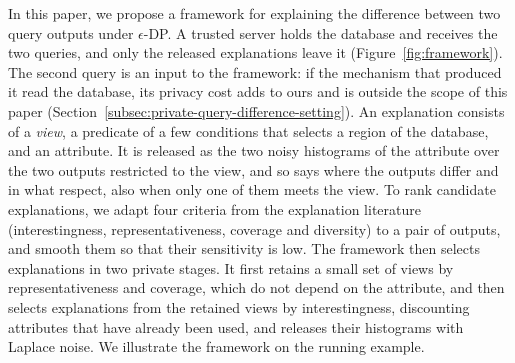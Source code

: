 In this paper, we propose a framework for explaining the difference between two query outputs under $\epsilon$-DP.
A trusted server holds the database and receives the two queries, and only the released explanations leave it (Figure~\ref{fig:framework}).
The second query is an input to the framework: if the mechanism that produced it read the database, its privacy cost adds to ours and is outside the scope of this paper (Section~\ref{subsec:private-query-difference-setting}).
An explanation consists of a \emph{view}, a predicate of a few conditions that selects a region of the database, and an attribute.
It is released as the two noisy histograms of the attribute over the two outputs restricted to the view, and so says where the outputs differ and in what respect, also when only one of them meets the view.
To rank candidate explanations, we adapt four criteria from the explanation literature (interestingness, representativeness, coverage and diversity) to a pair of outputs, and smooth them so that their sensitivity is low.
The framework then selects explanations in two private stages.
It first retains a small set of views by representativeness and coverage, which do not depend on the attribute, and then selects explanations from the retained views by interestingness, discounting attributes that have already been used, and releases their histograms with Laplace noise.
We illustrate the framework on the running example.

